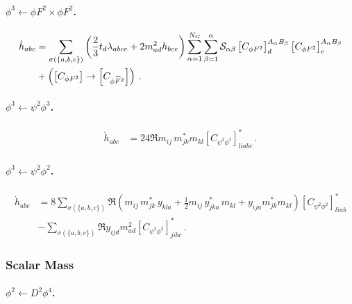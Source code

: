 \paragraph{\texorpdfstring{$\phi^3 \leftarrow \phi F^2 \times \phi F^2$}{phi3fromphiF2xphiF2}.}

\begin{align}
    \dot h_{abc} &= \sum_{\sigma(\{a,b,c\})} \left(\frac{2}{3} t_{d}\lambda_{abce}+2 m^2_{ad} h_{bce}\right) \sum_{\alpha=1}^{N_G}\sum_{\beta=1}^\alpha \mathcal{S}_{\alpha\beta} \left[C_{\phi F^2}\right]_{d}^{A_\alpha B_\beta} \left[C_{\phi F^2}\right]_{e}^{A_\alpha B_\beta}\nonumber \\
    &+ \left(\left[C_{\phi F^2}\right]\to \left[C_{\phi \widetilde{F}^2}\right]\right)\,.
\end{align}

\paragraph{\texorpdfstring{$\phi^3\leftarrow \psi^2\phi^3$}{trilinearfrompsi2phi3}.}

\begin{align}
    \dot h_{abc} &= 24\Re{m_{ij}\, m_{jk}^*m_{kl}\left[C_{\psi^2\phi^3}\right]_{liabc}^*}\,.\label{trilinear_psi2phi3}
\end{align}

\paragraph{\texorpdfstring{$\phi^3\leftarrow \psi^2\phi^2$}{trilinearfrompsi2phi2}.}

\begin{align}
    \dot h_{abc} &= 8\sum_{\sigma(\{a,b,c\})} \Re{\left(m_{ij}\, m_{jk}^*\, y_{kla}+\frac{1}{2}m_{ij}\, y_{jka}^*\, m_{kl}+y_{ija}m_{jk}^* m_{kl}\right)\left[C_{\psi^2\phi^2}\right]_{liab}^*}\nonumber\\
    & -\sum_{\sigma(\{a,b,c\})} \Re{y_{ijd}m^2_{ad}\left[C_{\psi^2\phi^2}\right]_{jibc}^*}\,.\label{trilinear_psi2phi2}
\end{align}



\subsubsection{Scalar Mass}

\paragraph{\texorpdfstring{$\phi^{2} \leftarrow D^2\phi^4$}{phi2fromD2phi4}.}

